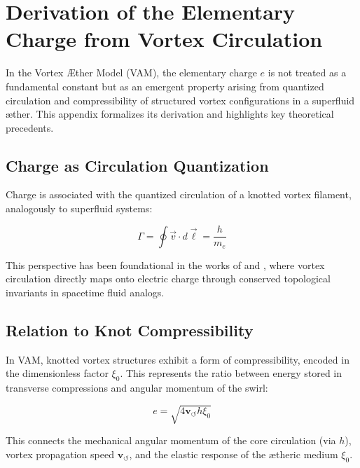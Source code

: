 \section{Derivation of the Elementary Charge from Vortex Circulation}
\label{appendix:charge}

In the Vortex Æther Model (VAM), the elementary charge \( e \) is not treated as a fundamental constant but as an emergent property arising from quantized circulation and compressibility of structured vortex configurations in a superfluid æther. This appendix formalizes its derivation and highlights key theoretical precedents.

\subsection*{Charge as Circulation Quantization}

Charge is associated with the quantized circulation of a knotted vortex filament, analogously to superfluid systems:

\begin{equation}
    \Gamma = \oint \vec{v} \cdot d\vec{\ell} = \frac{h}{m_e}
\end{equation}

This perspective has been foundational in the works of \cite{kiehn2005topological} and \cite{sbitnev2015hydro2}, where vortex circulation directly maps onto electric charge through conserved topological invariants in spacetime fluid analogs.

\subsection*{Relation to Knot Compressibility}

In VAM, knotted vortex structures exhibit a form of compressibility, encoded in the dimensionless factor \( \xi_0 \). This represents the ratio between energy stored in transverse compressions and angular momentum of the swirl:

\begin{equation}
    e = \sqrt{4 \mathbf{v}_{\scriptscriptstyle\boldsymbol{\circlearrowleft}} h \xi_0}
\end{equation}

This connects the mechanical angular momentum of the core circulation (via \( h \)), vortex propagation speed \( \mathbf{v}_{\scriptscriptstyle\boldsymbol{\circlearrowleft}} \), and the elastic response of the ætheric medium \( \xi_0 \).

